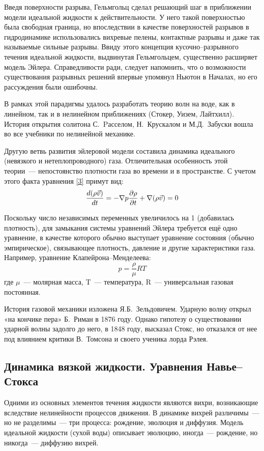 Введя поверхности разрыва, Гельмгольц сделал решающий шаг в приближении модели идеальной жидкости к действительности. 
У него такой поверхностью была свободная граница, но впоследствии в качестве поверхностей разрывов в гидродинамике 
использовались вихревые пелены, контактные разрывы и даже так называемые сильные разрывы. Ввиду этого концепция 
кусочно--разрывного течения идеальной жидкости, выдвинутая Гельмгольцем, существенно расширяет модель Эйлера. 
Справедливости ради, следует напомнить, что о возможности существования разрывных решений впервые упомянул Ньютон 
в Началах, но его рассуждения были ошибочны.

В рамках этой парадигмы удалось разработать теорию волн на воде, как в линейном, так и в нелинейном приближениях 
(Стокер, Уизем, Лайтхилл). История открытия солитона С.~Pасселом, Н.~Крускалом и М.Д.~Забуски вошла во все 
учебники по нелинейной механике.

Другую ветвь развития эйлеровой модели составила динамика идеального (невязкого и нетеплопроводного) газа. 
Отличительная особенность этой теории~--- непостоянство плотности газа во времени и в пространстве. С учетом 
этого факта уравнения \ref{3} примут вид:
$$
\frac{d (\rho \vec v)}{d t} = - \nabla p \\
\frac{\partial \rho }{\partial t} + \nabla (\rho \vec v) = 0
\label{4}
$$

Поскольку число независимых переменных увеличилось на 1 (добавилась плотность), для замыкания системы уравнений 
Эйлера требуется ещё одно уравнение, в качестве которого обычно выступает уравнение состояния (обычно эмпирическое),
связывающее плотность, давление и другие характеристики газа. Например, уравнение Клапейрона--Менделеева:
$$
p = \frac{\rho}{\mu}RT
\label{5}
$$
где $\mu$~--- молярная масса, T~--- температура, R~--- универсальная газовая постоянная.

История газовой механики изложена Я.Б.~Зельдовичем. Ударную волну открыл «на кончике пера» Б.~Риман в 1876 году. 
Однако гипотезу о существовании ударной волны задолго до него, в 1848 году, высказал Стокс, но отказался от 
нее под влиянием критики В.~Томсона и своего ученика лорда Рэлея.

\subsection{Динамика вязкой жидкости. Уравнения Навье--Стокса}

Одними из основных элементов течения жидкости являются вихри, возникающие вследствие нелинейности процессов 
движения. В динамике вихрей различимы~--- но не разделимы~--- три процесса: рождение, эволюция и диффузия.
 Модель идеальной жидкости (сухой воды) описывает эволюцию, иногда~--- рождение, но никогда~--- диффузию вихрей.

